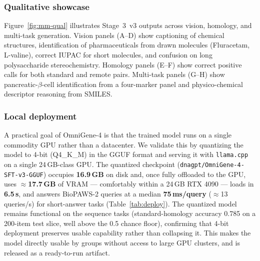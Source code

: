 \documentclass[11pt]{article}
\begin{document}
\subsubsection{Qualitative showcase}

Figure~\ref{fig:mm-qual} illustrates Stage~3~v3 outputs across vision, homology, and multi-task generation. Vision panels (A--D) show captioning of chemical structures, identification of pharmaceuticals from drawn molecules (Fluracetam, L-valine), correct IUPAC for short molecules, and confusion on long polysaccharide stereochemistry. Homology panels (E--F) show correct positive calls for both standard and remote pairs. Multi-task panels (G--H) show pancreatic-$\beta$-cell identification from a four-marker panel and physico-chemical descriptor reasoning from SMILES.

\subsubsection{Local deployment}
\label{sec:deploy}

A practical goal of OmniGene-4 is that the trained model runs on a single commodity GPU
rather than a datacenter. We validate this by quantizing the model to 4-bit (Q4\_K\_M) in
the GGUF format and serving it with \texttt{llama.cpp} on a single 24\,GB-class GPU. The
quantized checkpoint (\texttt{dnagpt/OmniGene-4-SFT-v3-GGUF}) occupies \textbf{16.9\,GB} on
disk and, once fully offloaded to the GPU, uses \textbf{$\approx$17.7\,GB} of VRAM ---
comfortably within a 24\,GB RTX 4090 --- loads in \textbf{6.5\,s}, and answers BioPAWS-2
queries at a median \textbf{75\,ms/query} ($\approx$13 queries/s) for short-answer tasks
(Table~\ref{tab:deploy}). The quantized model remains functional on the sequence tasks
(standard-homology accuracy 0.785 on a 200-item test slice, well above the 0.5 chance
floor), confirming that 4-bit deployment preserves usable capability rather than collapsing
it. This makes the model directly usable by groups without access to large GPU clusters, and
is released as a ready-to-run artifact.
\end{document}
